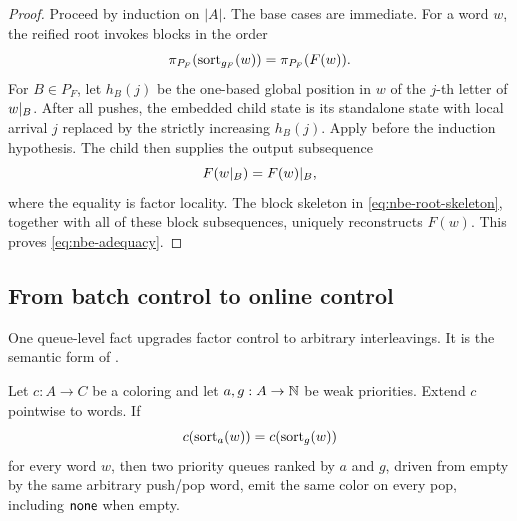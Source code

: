 \begin{proof}
Proceed by induction on \(|A|\).  The base cases are immediate.  For a word
\(w\), the reified root invokes blocks in the order
\begin{equation}
 \pi_{P_F}(\operatorname{sort}_{g_F}(w))=\pi_{P_F}(F(w)).
 \label{eq:nbe-root-skeleton}
\end{equation}
For \(B\in P_F\), let \(h_B(j)\) be the one-based global position in \(w\) of
the \(j\)-th letter of \(w\mathord{|}_{B}\).  After all pushes, the embedded
child state is its standalone state with local arrival \(j\) replaced by the
strictly increasing \(h_B(j)\).  Apply
 before the induction hypothesis.  The child
then supplies the output subsequence
\[
 F(w\mathord{|}_{B})=F(w)\mathord{|}_{B},
\]
where the equality is factor locality.  The block skeleton in
\autoref{eq:nbe-root-skeleton}, together with all of these block subsequences,
uniquely reconstructs \(F(w)\).  This proves \autoref{eq:nbe-adequacy}.
\end{proof}

\subsection{From batch control to online control}

One queue-level fact upgrades factor control to arbitrary interleavings.  It
is the semantic form of .

\begin{lemma}
\label{lem:nbe-colored}
Let \(c:A\to C\) be a coloring and let \(a,g:A\to\mathbb{N}\) be weak priorities.
Extend \(c\) pointwise to words.
If
\begin{equation}
 c(\operatorname{sort}_a(w))=c(\operatorname{sort}_g(w))
 \label{eq:nbe-colored-batch}
\end{equation}
for every word \(w\), then two priority queues ranked by \(a\) and \(g\),
driven from empty by the same arbitrary push/pop word, emit the same color on
every pop, including \(\mathsf{none}\) when empty.
\end{lemma}

